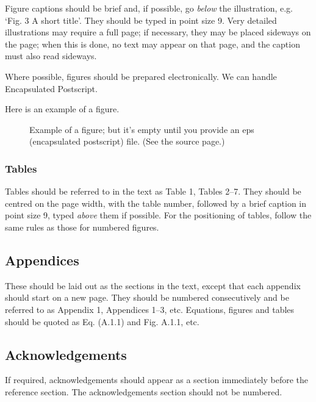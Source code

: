 \documentclass[dvips]{article}
\begin{document}
Figure captions should be brief and, if possible,
go {\it below} the illustration, e.g. `Fig. 3 A short title'.
They should be typed in point size 9. Very detailed illustrations may
require a full page; if necessary, they may be placed sideways on the
page; when this is done, no text may appear on that page, and the
caption must also read sideways. 

Where possible, figures should be prepared electronically.
We can handle Encapsulated Postscript.

Here is an example of a figure.

\begin{figure}
\label{fig:cc}
\caption{Example of a figure; but it's empty
until you provide an eps (encapsulated postscript)
file. (See the source page.)}
\begin{center}
\end{center}
\end{figure}

\subsubsection{Tables}

Tables should be referred to in the text as Table 1, Tables 2--7.
They should be centred on the page width, with the table
number, followed by a brief caption in point size 9, typed
{\it above} them if possible. For the
positioning of tables, follow the same rules as those for numbered figures.

\subsection{Appendices}

These should be laid out as the sections in the text,
except that each appendix should start on a new page.
They should be numbered consecutively and be referred
to as Appendix 1, Appendices 1--3, etc. 
Equations, figures and tables should be
quoted as Eq. (A.1.1) and Fig. A.1.1, etc.  

\subsection*{Acknowledgements}

If required, acknowledgements  should appear as a section
immediately before the reference section.
The acknowledgements section should not be numbered.
\end{document}

